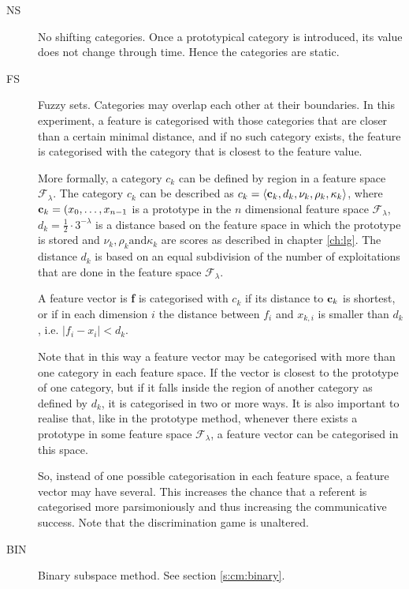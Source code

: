 \begin{description}
\item[NS] No shifting categories. Once a prototypical category is introduced, its value does not change through time. Hence the categories are static.

\item[FS] Fuzzy sets. Categories may overlap each other at their boundaries. In this experiment, a feature is categorised with those categories that are closer than a certain minimal distance, and if no such category exists, the feature is categorised with the category that is closest to the feature value. 

More formally, a category $c_k$ can be defined by region in a feature space ${\mathcal F}_\lambda$. The category $c_k$ can be described as $c_k=\langle {\bf c}_k,d_k,\nu_k,\rho_k,\kappa_k \rangle$, where ${\bf c}_k=(x_0,\ldots,x_{n-1}$ is a prototype in the $n$ dimensional feature space ${\mathcal F}_\lambda$, $d_k=\frac{1}{2} \cdot 3^{-\lambda}$ is a distance based on the feature space in which the prototype is stored and $\nu_k, \rho_k \mbox{and} \kappa_k$ are scores as described in chapter \ref{ch:lg}. The distance $d_k$ is based on an equal subdivision of the number of exploitations that are done in the feature space ${\mathcal F}_\lambda$.

A feature vector is {\bf f} is categorised with $c_k$ if its distance to ${\bf c}_k$ is shortest, or if in each dimension $i$ the distance between $f_i$ and $x_{k,i}$ is smaller than $d_k$, i.e. $|f_i-x_i|<d_k$. 

Note that in this way a feature vector may be categorised with more than one category in each feature space. If the vector is closest to the prototype of one category, but if it falls inside the region of another category as defined by $d_k$, it is categorised in two or more ways. It is also important to realise that, like in the prototype method, whenever there exists a prototype in some feature space ${\mathcal F}_\lambda$, a feature vector can be categorised in this space.

So, instead of one possible categorisation in each feature space, a feature vector may have several. This increases the chance that a referent is categorised more parsimoniously and thus increasing the communicative success. Note that the discrimination game is unaltered.

\item[BIN] Binary subspace method. See section \ref{s:cm:binary}.
\end{description}

